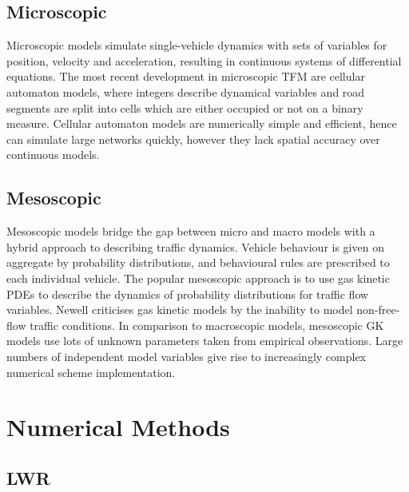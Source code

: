 \subsection{Microscopic}

	Microscopic models simulate single-vehicle dynamics with sets of variables for position, velocity and acceleration, resulting in continuous systems of differential equations. The most recent development in microscopic TFM are cellular automaton models, where integers describe dynamical variables and road segments are split into cells which are either occupied or not on a binary measure. Cellular automaton models are numerically simple and efficient, hence can simulate large networks quickly, however they lack spatial accuracy over continuous models. 

\subsection{Mesoscopic}

	Mesoscopic models bridge the gap between micro and macro models with a hybrid approach to describing traffic dynamics. Vehicle behaviour is given on aggregate by probability distributions, and behavioural rules are prescribed to each individual vehicle. The popular mesoscopic approach is to use gas kinetic PDEs to describe the dynamics of probability distributions for traffic flow variables. Newell \cite{Newell95} criticises gas kinetic models by the inability to model non-free-flow traffic conditions. In comparison to macroscopic models, mesoscopic GK models use lots of unknown parameters taken from empirical observations. Large numbers of independent model variables give rise to increasingly complex numerical scheme implementation. 

\section{Numerical Methods}
\subsection{LWR}

